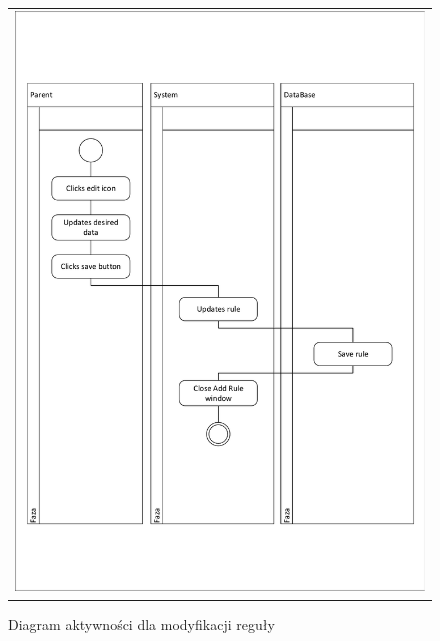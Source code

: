 \documentclass{sprawozdanie-agh}
\begin{document}
			\begin{figure}[H]
				\centering
				\begin{tabular}{c}
					\includegraphics[width=.95\textwidth]{crudUpdate} 
				\end{tabular}
			\caption{Diagram aktywności dla modyfikacji reguły}
			\end{figure}
\end{document}
